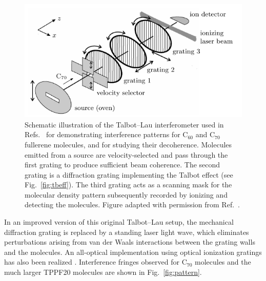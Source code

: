 \documentclass[3p,sort&compress,12pt]{elsarticle}
\begin{document}
\begin{figure}
\centering
\includegraphics[scale=0.75]{c70setup.pdf}
\caption{Schematic illustration of the Talbot--Lau interferometer used in Refs.~\cite{Arndt:1999:rc,Brezger:2002:mu,Hornberger:2003:tv,Hackermueller:2002:wb,Hackermuller:2004:rd} for demonstrating interference patterns for C$_{60}$ and C$_{70}$ fullerene molecules, and for studying their decoherence. Molecules emitted from a source are velocity-selected and pass through the first grating to produce sufficient beam coherence. The second grating is a diffraction grating implementing the Talbot effect (see Fig.~\ref{fig:tbeff}). The third grating acts as a scanning mask for the molecular density pattern subsequently recorded by ionizing and detecting the molecules.  Figure adapted with permission from Ref.~\cite{Brezger:2002:mu}.}
\label{fig:c70-setup}
\end{figure} 

In an improved version \cite{Gerlich:2007:om} of this original Talbot--Lau setup, the mechanical diffraction grating is replaced by a standing laser light wave, which eliminates perturbations arising from van der Waals interactions between the grating walls and the molecules. An all-optical implementation using optical ionization gratings has also been realized \cite{Haslinger:2013:ii}. Interference fringes observed for C$_{70}$ molecules and the much larger TPPF20 molecules \cite{Eibenberger:2013:az} are shown in Fig.~\ref{fig:pattern}.
 
\end{document}
